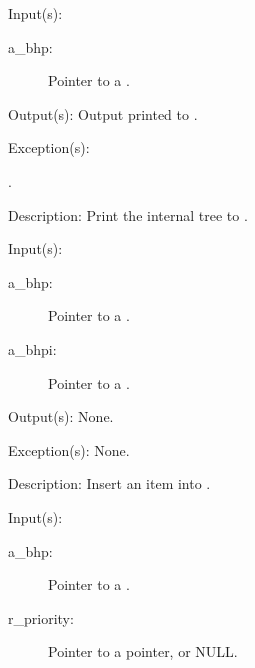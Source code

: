 \begin{capi}
\begin{capilist}
	\end{capilist}
\label{bhp_dump}
	\begin{capilist}
	\item[Input(s): ]
		\begin{description}\item[]
		\item[a\_bhp: ]
			Pointer to a .
		\end{description}
	\item[Output(s): ]
		Output printed to .
	\item[Exception(s): ]
		\begin{description}\item[]
		\item[.]
		\end{description}
	\item[Description: ]
		Print the internal tree to .
	\end{capilist}
\label{bhp_insert}
	\begin{capilist}
	\item[Input(s): ]
		\begin{description}\item[]
		\item[a\_bhp: ]
			Pointer to a \classname{bhp}.
		\item[a\_bhpi: ]
			Pointer to a \classname{bhpi}.
		\end{description}
	\item[Output(s): ] None.
	\item[Exception(s): ] None.
	\item[Description: ]
		Insert an item into \cvar{a\_bhp}.
	\end{capilist}
\label{bhp_min_find}
	\begin{capilist}
	\item[Input(s): ]
		\begin{description}\item[]
		\item[a\_bhp: ]
			Pointer to a .
		\item[r\_priority: ]
			Pointer to a pointer, or NULL.

\end{description}
\end{capilist}
\end{capi}
